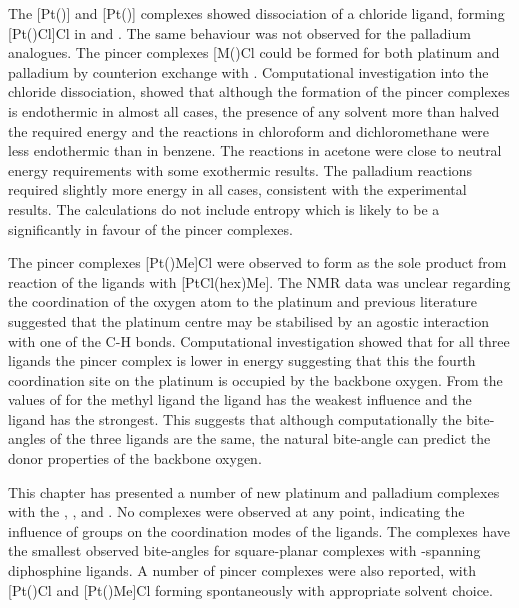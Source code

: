 The [Pt(\tBuxantphos)] and [Pt(\tButhixantphos)] complexes showed dissociation of a chloride ligand, forming [Pt(\tBuxantphosk)Cl]Cl in  and .  The same behaviour was not observed for the palladium analogues.  The pincer complexes [M(\tBuxantphosk)Cl\ce{]+} could be formed for both platinum and palladium by counterion exchange with .  Computational investigation into the chloride dissociation, showed that although the formation of the pincer complexes is endothermic in almost all cases, the presence of any solvent more than halved the required energy  and the reactions in chloroform and dichloromethane were less endothermic than in benzene.  The reactions in acetone were close to neutral energy requirements with some exothermic results.  The palladium reactions required slightly more energy in all cases, consistent with the experimental results.  The calculations do not include entropy which is likely to be a significantly in favour of the pincer complexes.    

The pincer complexes [Pt(\tBuxantphosk)Me]Cl were observed to form as the sole product from reaction of the \tBuxantphos{} ligands with [PtCl(\acrshort{hex})Me].  The NMR data was unclear regarding the coordination of the oxygen atom to the platinum and previous literature suggested that the platinum centre may be stabilised by an agostic interaction with one of the \tBu{} C-H bonds.  Computational investigation showed that for all three \tBuxantphos{} ligands the pincer complex is lower in energy suggesting that this the fourth coordination site on the platinum is occupied by the backbone oxygen.  From the values of \JPC{} for the methyl ligand the \tBusixantphos{} ligand has the weakest \trans{} influence and the \tBuxantphos{} ligand has the strongest.  This suggests that although computationally the bite-angles of the three ligands are the same, the natural bite-angle can predict the donor properties of the backbone oxygen.  

This chapter has presented a number of new platinum and palladium complexes with the \tBusixantphos{}, \tButhixantphos{}, and \tBuxantphos{}.  No \cis{} complexes were observed at any point, indicating the influence of \tBu{} groups on the coordination modes of the ligands.  The \trans{} complexes have the smallest observed bite-angles for square-planar complexes with \trans{}-spanning diphosphine ligands.  A number of \tBuxantphos{} pincer complexes were also reported, with [Pt(\tBuxantphos)Cl\ce{]+} and [Pt(\tBuxantphos)Me]Cl forming spontaneously with appropriate solvent choice. 	
	
	
	
	
	
	
	
	
	
	
	
	
	
	
	
	
	
	
	



